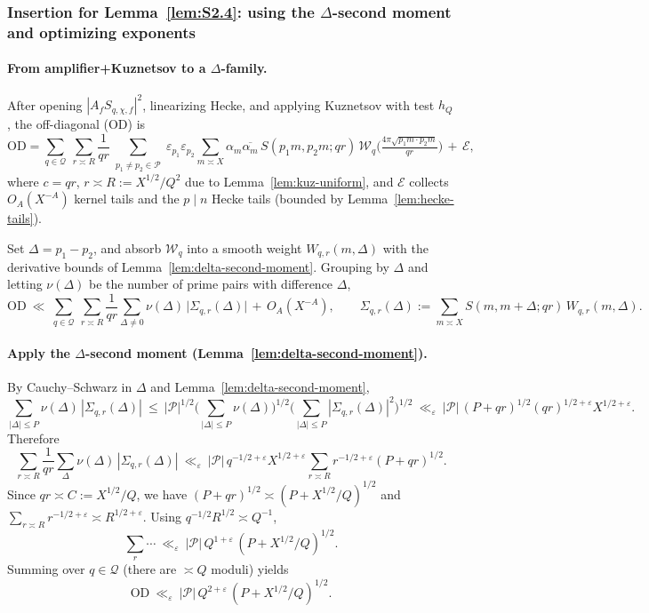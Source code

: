 \documentclass[11pt]{article}
\theoremstyle{definition}
\theoremstyle{remark}
\begin{document}
\subsubsection*{Insertion for Lemma~\ref{lem:S2.4}: using the $\Delta$-second moment and optimizing exponents}

\paragraph{From amplifier+Kuznetsov to a $\Delta$-family.}
After opening $|A_f S_{q,\chi,f}|^2$, linearizing Hecke, and applying Kuznetsov with test $h_Q$, the off-diagonal (OD) is
\[
	\mathrm{OD}
	=\sum_{q\in\mathcal Q}\ \sum_{r\asymp R}\frac{1}{qr}
	\!\!\sum_{\substack{p_1\ne p_2\in\mathcal P}}\!\!\varepsilon_{p_1}\varepsilon_{p_2}\!
	\sum_{m\asymp X}\alpha_m\overline{\alpha_{m}}\,
	S(p_1m,p_2m;qr)\,\mathcal W_{q}\!\Big(\tfrac{4\pi\sqrt{p_1m\cdot p_2m}}{qr}\Big)\,+\,\mathcal E,
\]
where $c=qr$, $r\asymp R:=X^{1/2}/Q^{2}$ due to Lemma~\ref{lem:kuz-uniform},
and $\mathcal E$ collects $O_A(X^{-A})$ kernel tails and the $p\mid n$ Hecke tails
(bounded by Lemma~\ref{lem:hecke-tails}).


Set $\Delta=p_1-p_2$, and absorb $\mathcal W_q$ into a smooth weight $W_{q,r}(m,\Delta)$ with the derivative bounds of Lemma~\ref{lem:delta-second-moment}. Grouping by $\Delta$ and letting $\nu(\Delta)$ be the number of prime pairs with difference $\Delta$,
\[
	\mathrm{OD}\ \ll\ \sum_{q\in\mathcal Q}\ \sum_{r\asymp R}\frac{1}{qr}\sum_{\Delta\ne 0}\nu(\Delta)\,
	\Big|\Sigma_{q,r}(\Delta)\Big| \,+\, O_A(X^{-A}),\qquad
	\Sigma_{q,r}(\Delta):=\sum_{m\asymp X} S(m,m+\Delta;qr)\,W_{q,r}(m,\Delta).
\]

\paragraph{Apply the $\Delta$-second moment (Lemma~\ref{lem:delta-second-moment}).}
By Cauchy–Schwarz in $\Delta$ and Lemma~\ref{lem:delta-second-moment},
\[
	\sum_{|\Delta|\le P}\nu(\Delta)\,|\Sigma_{q,r}(\Delta)|
	\ \le\ |\mathcal P|^{1/2}\Big(\sum_{|\Delta|\le P}\nu(\Delta)\Big)^{1/2}
	\Big(\sum_{|\Delta|\le P}|\Sigma_{q,r}(\Delta)|^2\Big)^{1/2}
	\ \ll_\varepsilon\ |\mathcal P|\,(P+qr)^{1/2}(qr)^{1/2+\varepsilon}X^{1/2+\varepsilon}.
\]
Therefore
\[
	\sum_{r\asymp R}\frac{1}{qr}\sum_{\Delta}\nu(\Delta)\,|\Sigma_{q,r}(\Delta)|
	\ \ll_\varepsilon\ |\mathcal P|\,q^{-1/2+\varepsilon}X^{1/2+\varepsilon}\!\!\sum_{r\asymp R} r^{-1/2+\varepsilon}(P+qr)^{1/2}.
\]
Since $qr\asymp C:=X^{1/2}/Q$, we have $(P+qr)^{1/2}\asymp (P+X^{1/2}/Q)^{1/2}$ and $\sum_{r\asymp R} r^{-1/2+\varepsilon}\asymp R^{1/2+\varepsilon}$. Using $q^{-1/2}R^{1/2}\asymp Q^{-1}$,
\[
	\sum_{r}\cdots\ \ll_\varepsilon\ |\mathcal P|\,Q^{1+\varepsilon}\,(P+X^{1/2}/Q)^{1/2}.
\]
Summing over $q\in\mathcal Q$ (there are $\asymp Q$ moduli) yields
\begin{equation}\label{eq:OD-final}
	\mathrm{OD}\ \ll_\varepsilon\ |\mathcal P|\,Q^{2+\varepsilon}\,(P+X^{1/2}/Q)^{1/2}.
\end{equation}
\end{document}
